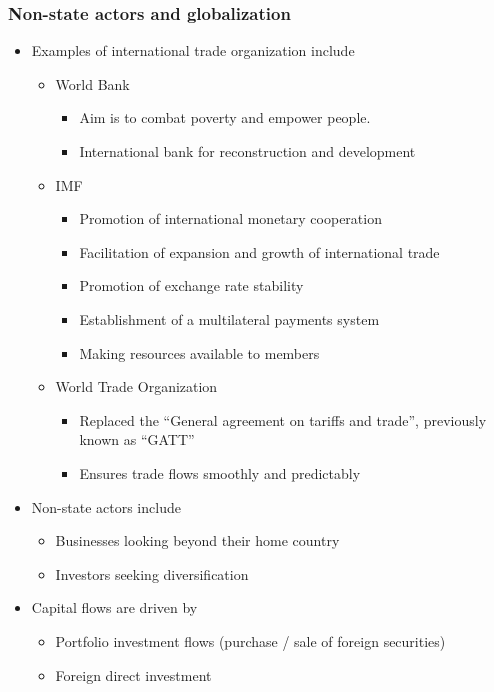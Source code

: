 \documentclass[../notes_compiled.tex]{subfiles}
\begin{document}
\subsubsection{Non-state actors and globalization}
\begin{itemize}
\item Examples of international trade organization include
\begin{itemize}
\item World Bank
\begin{itemize}
\item Aim is to combat poverty and empower people.
\item International bank for reconstruction and development
\end{itemize}
\item IMF
\begin{itemize}
\item Promotion of international monetary cooperation
\item Facilitation of expansion and growth of international trade
\item Promotion of exchange rate stability
\item Establishment of a multilateral payments system
\item Making resources available to members
\end{itemize}
\item World Trade Organization
\begin{itemize}
\item Replaced the ``General agreement on tariffs and trade'', previously known as ``GATT''
\item Ensures trade flows smoothly and predictably
\end{itemize}
\end{itemize}

\item Non-state actors include
\begin{itemize}
\item Businesses looking beyond their home country
\item Investors seeking diversification
\end{itemize}

\item Capital flows are driven by
\begin{itemize}
\item Portfolio investment flows (purchase / sale of foreign securities)
\item Foreign direct investment
\end{itemize}
\end{itemize}
\end{document}
